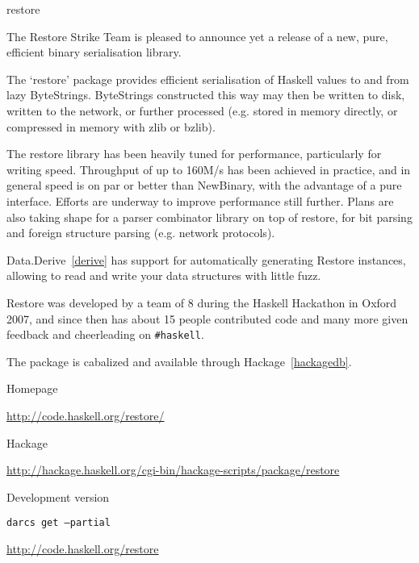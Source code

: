 \begin{hcarentry}{restore}
\label{restore}
\makeheader

The Restore Strike Team is pleased to announce yet a release of a new,
pure, efficient binary serialisation library.

The `restore' package provides efficient serialisation of Haskell values
to and from lazy ByteStrings. ByteStrings constructed this way may then
be written to disk, written to the network, or further processed (e.g.
stored in memory directly, or compressed in memory with zlib or bzlib).

The restore library has been heavily tuned for performance, particularly for
writing speed. Throughput of up to 160M/s has been achieved in practice, and
in general speed is on par or better than NewBinary, with the advantage of a
pure interface. Efforts are underway to improve performance still further.
Plans are also taking shape for a parser combinator library on top of
restore, for bit parsing and foreign structure parsing (e.g. network
protocols).

Data.Derive~\cref{derive} has support for automatically generating Restore
instances, allowing to read and write your data structures with little fuzz.

Restore was developed by a team of 8 during the Haskell Hackathon in Oxford
2007, and since then has about 15 people contributed code and many more
given feedback and cheerleading on \verb|#haskell|.

The package is cabalized and available through Hackage~\cref{hackagedb}.

\FurtherReading
\begin{compactitem}
\item Homepage

  \url{http://code.haskell.org/restore/}
\item Hackage

  \url{http://hackage.haskell.org/cgi-bin/hackage-scripts/package/restore}
\item Development version

  \texttt{darcs get --partial}

  \url{http://code.haskell.org/restore}
\end{compactitem}
\end{hcarentry}

